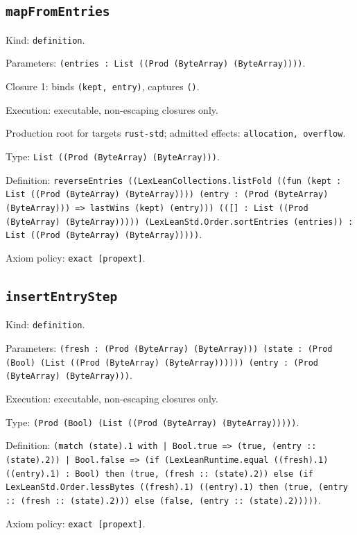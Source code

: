 \documentclass[11pt]{article}
\begin{document}
\subsection*{\texttt{mapFromEntries}}
\noindent Kind: \texttt{definition}.\par
\noindent Parameters: \texttt{(entries : List ((Prod (ByteArray) (ByteArray))))}.\par
\noindent Closure 1: binds \texttt{(kept, entry)}, captures \texttt{()}.\par
\noindent Execution: executable, non-escaping closures only.\par
\noindent Production root for targets \texttt{rust-std}; admitted effects: \texttt{allocation, overflow}.\par
\noindent Type: \texttt{List ((Prod (ByteArray) (ByteArray)))}.\par
\noindent Definition: \texttt{reverseEntries ((LexLeanCollections.listFold ((fun (kept : List ((Prod (ByteArray) (ByteArray)))) (entry : (Prod (ByteArray) (ByteArray))) => lastWins (kept) (entry))) (([] : List ((Prod (ByteArray) (ByteArray))))) (LexLeanStd.Order.sortEntries (entries)) : List ((Prod (ByteArray) (ByteArray)))))}.\par
\noindent Axiom policy: \texttt{exact [propext]}.\par
\subsection*{\texttt{insertEntryStep}}
\noindent Kind: \texttt{definition}.\par
\noindent Parameters: \texttt{(fresh : (Prod (ByteArray) (ByteArray))) (state : (Prod (Bool) (List ((Prod (ByteArray) (ByteArray)))))) (entry : (Prod (ByteArray) (ByteArray)))}.\par
\noindent Execution: executable, non-escaping closures only.\par
\noindent Type: \texttt{(Prod (Bool) (List ((Prod (ByteArray) (ByteArray)))))}.\par
\noindent Definition: \texttt{(match (state).1 with | Bool.true => (true, (entry :: (state).2)) | Bool.false => (if (LexLeanRuntime.equal ((fresh).1) ((entry).1) : Bool) then (true, (fresh :: (state).2)) else (if LexLeanStd.Order.lessBytes ((fresh).1) ((entry).1) then (true, (entry :: (fresh :: (state).2))) else (false, (entry :: (state).2)))))}.\par
\noindent Axiom policy: \texttt{exact [propext]}.\par
\end{document}
